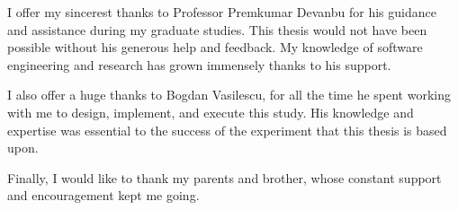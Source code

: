 \begin{frontmatter}
\maketitle





\tableofcontents
\listoffigures
\listoftables

    \newpage
    \begin{inlineabstract}
		\myabstract
		
    \end{inlineabstract}

\begin{acknowledgments}
I offer my sincerest thanks to Professor Premkumar Devanbu for his guidance and assistance during my graduate studies. This thesis would not have been possible without his generous help and feedback. My knowledge of software engineering and research has grown immensely thanks to his support.

I also offer a huge thanks to Bogdan Vasilescu, for all the time he spent working with me to design, implement, and execute this study. His knowledge and expertise was essential to the success of the experiment that this thesis is based upon.

Finally, I would like to thank my parents and brother, whose constant support and encouragement kept me going.
\end{acknowledgments}

\end{frontmatter}
